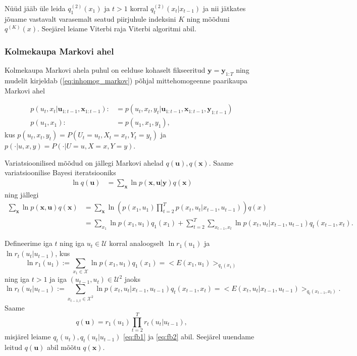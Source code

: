 Nüüd jääb üle leida $q^{(2)}_1 (x_1)$ ja $t>1$ korral $q^{(2)}_t (x_t | x_{t-1})$ ja nii jätkates jõuame vastavalt varasemalt seatud piirjuhule indeksini $K$ ning mõõduni $q^{(K)}(x)$. Seejärel leiame Viterbi raja Viterbi algoritmi abil.

\subsubsection{Kolmekaupa Markovi ahel}

Kolmekaupa Markovi ahela puhul on eelduse kohaselt fikseeritud $\mathbf{y} = \mathbf{y}_{1:T}$ ning mudelit kirjeldab (\ref{eq:inhomog_markov}) põhjal mittehomogeenne paarikaupa Markovi ahel

\begin{align}
    \label{eq:model2_1}
    p(u_{t}, x_{t} | \bm{u}_{1:t-1}, \bm{x}_{1:t-1} ) :&= p(u_t, x_t, y_t | \bm{u}_{1:t-1}, \bm{x}_{1:t-1}, \bm{y}_{1:t-1}) \\
    \label{eq:model2_2}
    p(u_1,x_1) :&= p(u_1, x_1, y_1),
\end{align}
kus $p(u_{t},x_{t},y_{t}) = P(U_{t} = u_{t}, X_{t} = x_{t}, Y_{t}=y_t)$ ja $p(\cdot|u,x,y) = P(\cdot | U = u, X=x, Y=y)$. 

Variatsioonilised mõõdud on jällegi Markovi ahelad $q(\bm{u}), q(\bm{x})$. Saame variatsioonilise Bayesi iteratsiooniks
\begin{align*}
    \ln q(\bm{u}) &= \sum_{\bm{x}} \ln p(\bm{x},\bm{u} | \bm{y}) q(\bm{x})
\end{align*}
ning jällegi
\begin{align*}
    \sum_{\bm{x}} \ln p(\bm{x},\bm{u}) q(\bm{x}) &=  \sum_{\bm{x}} \ln \left( p(x_1, u_1) \prod_{t=2}^T p(x_t,u_t | x_{t-1}, u_{t-1}) \right) q(x) \\
    &= \sum_{x_1} \ln p(x_1, u_1) q_1(x_1)  + \sum_{t=2}^T \sum_{x_{t-1}, x_{t}} \ln p(x_t,u_t | x_{t-1}, u_{t-1}) q_t(x_{t-1},x_{t}).
\end{align*}

Defineerime iga $t$ ning iga $u_t \in \mathcal{U}$ korral analoogselt $\ln r_1(u_1)$ ja $\ln r_t(u_t | u_{t-1})$, kus
$$\ln r_1(u_1) := \sum_{x_1 \in \mathcal{X}} \ln p(x_1,u_1) q_1(x_1) = \big< E(x_1,u_1) \big>_{q_1(x_1)}$$
ning iga $t > 1$ ja iga $(u_{t-1}, u_t) \in \mathcal{U}^2$ jaoks
$$\ln r_t(u_{t}|u_{t-1}) := \sum_{x_{t-1,t} \in \mathcal{X}^2} \ln p(x_{t},u_t | x_{t-1},u_{t-1}) q_t(x_{t-1}, x_t) = \big< E(x_t,u_t | x_{t-1},u_{t-1}) \big>_{q_t(x_{t-1}, x_t)}. $$ Saame
$$q(\bm{u}) = r_1(u_1)\prod_{t=2}^T r_t(u_t | u_{t-1}),$$
misjärel leiame $q_t(u_t), q_t(u_t | u_{t-1})$ \eqref{eq:fb1} ja \eqref{eq:fb2} abil. Seejärel uuendame leitud $q(\bm{u})$ abil mõõtu $q(\bm{x})$.

